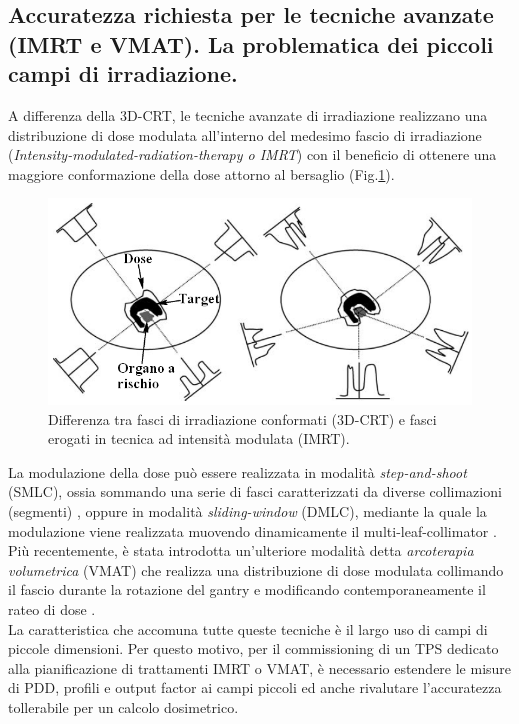 \subsection{Accuratezza richiesta per le tecniche avanzate (IMRT e VMAT). La problematica dei piccoli campi di irradiazione.}
\label{sec:accu_spec}
A differenza della 3D-CRT, le tecniche avanzate di irradiazione realizzano una distribuzione di dose modulata all'interno del medesimo fascio di irradiazione (\textit{Intensity-modulated-radiation-therapy o IMRT}) con il beneficio di ottenere una maggiore conformazione della dose attorno al bersaglio \cite{ICRU2010} (Fig.\ref{fig:3D_IMRT}).\\
\begin{figure}
\centering
\includegraphics[width=\textwidth]{./cap2/3D_IMRT.png}
\caption{Differenza tra fasci di irradiazione conformati (3D-CRT) e fasci erogati in tecnica ad intensità modulata (IMRT).}
\label{fig:3D_IMRT}
\end{figure}
La modulazione della dose può essere realizzata in modalità \textit{step-and-shoot} (SMLC), ossia sommando una serie di fasci caratterizzati da diverse collimazioni (segmenti) \cite{Bortfeld1994}, oppure in modalità \textit{sliding-window}  (DMLC), mediante la quale la modulazione viene realizzata muovendo dinamicamente il multi-leaf-collimator \cite{LING1996}. Più recentemente, è stata introdotta un'ulteriore modalità detta \textit{arcoterapia volumetrica} (VMAT) che realizza una distribuzione di dose modulata collimando il fascio durante la rotazione del gantry e modificando contemporaneamente il rateo di dose \cite{Otto2008}.\\
La caratteristica che accomuna tutte queste tecniche è il largo uso di campi di piccole dimensioni. Per questo motivo, per il commissioning di un TPS dedicato alla pianificazione di trattamenti IMRT o VMAT, è necessario estendere le misure di PDD, profili e output factor ai campi piccoli ed anche rivalutare l'accuratezza tollerabile per un calcolo dosimetrico.

